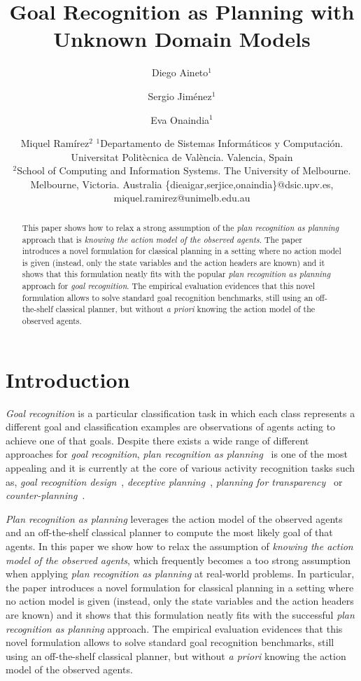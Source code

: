 \documentclass{article}
\title{Goal Recognition as Planning with Unknown Domain Models}
\author{
Diego Aineto$^1$\and
Sergio Jim\'enez$^1$\and
Eva Onaindia$^1$\And
\and
Miquel Ram\'irez$^2$
\affiliations
$^1${\small Departamento de Sistemas Inform\'aticos y Computaci\'on. Universitat Polit\`ecnica de Val\`encia. Valencia, Spain}\\
$^2${\small School of Computing and Information Systems. The University of Melbourne. Melbourne, Victoria. Australia}
\emails
{\scriptsize \{dieaigar,serjice,onaindia\}@dsic.upv.es, miquel.ramirez@unimelb.edu.au}}
\begin{document}
\maketitle

\begin{abstract}
This paper shows how to relax a strong assumption of the {\em plan recognition as planning} approach that is {\em knowing the action model of the observed agents}. The paper introduces a novel formulation for classical planning in a setting where no action model is given (instead, only the state variables and the action headers are known) and it shows that this formulation neatly fits with the popular {\em plan recognition as planning} approach for {\em goal recognition}. The empirical evaluation evidences that this novel formulation allows to solve standard goal recognition benchmarks, still using an off-the-shelf classical planner, but without {\em a priori} knowing the action model of the observed agents.  
\end{abstract}

\section{Introduction}
\label{sec:introduction}
{\em Goal recognition} is a particular classification task in which each class represents a different goal and classification examples are observations of agents acting to achieve one of that goals. Despite there exists a wide range of different approaches for {\em goal recognition}, {\em plan recognition as planning}~\cite{ramirez2009plan,ramirez2012plan} is one of the most appealing and it is currently at the core of various activity recognition tasks such as, {\em goal recognition design}~\cite{KerenGK14}, {\em deceptive planning}~\cite{masters2017deceptive}, {\em planning for transparency}~\cite{macnally2018action} or {\em counter-planning}~\cite{PozancoEFB18}.

{\em Plan recognition as planning} leverages the action model of the observed agents and an off-the-shelf classical planner to compute the most likely goal of that agents. In this paper we show how to relax the assumption of {\em knowing the action model of the observed agents}, which frequently becomes a too strong assumption when applying {\em plan recognition as planning} at real-world problems.  In particular, the paper introduces a novel formulation for classical planning in a setting where no action model is given (instead, only the state variables and the action headers are known) and it shows that this formulation neatly fits with the successful {\em plan recognition as planning} approach. The empirical evaluation evidences that this novel formulation allows to solve standard goal recognition benchmarks, still using an off-the-shelf classical planner, but without {\em a priori} knowing the action model of the observed agents.  
\end{document}
